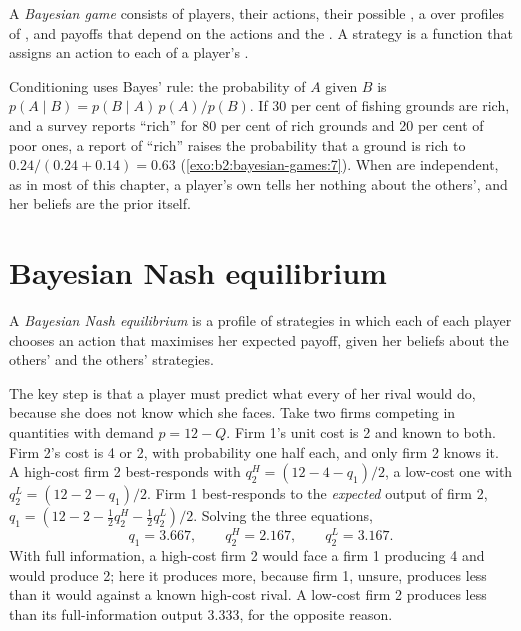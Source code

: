 \begin{definition}\label{def:b2:bayesian-games:bayesian-game}
A \emph{Bayesian game} consists of players, their actions, their possible , a  over profiles of , and payoffs that depend on the actions and the . A strategy is a function that
assigns an action to each of a player's .
\end{definition}

Conditioning uses Bayes' rule: the probability of $A$ given $B$ is $p(A \mid B) = p(B \mid A)\,p(A)/p(B)$. If 30 per cent of
fishing grounds are rich, and a survey reports ``rich'' for 80 per cent of rich grounds and 20 per cent of poor ones,
a report of ``rich'' raises the probability that a ground is rich to $0.24/(0.24 + 0.14) = 0.63$
(\cref{exo:b2:bayesian-games:7}). When  are independent, as in most of this chapter, a player's own  tells
her nothing about the others', and her beliefs are the prior itself.

\section{Bayesian Nash equilibrium}\label{sec:b2:bayesian-games:bne}

\begin{definition}\label{def:b2:bayesian-games:bne}
A \emph{Bayesian Nash equilibrium} is a profile of strategies in which each
 of each player chooses an action that maximises her expected payoff, given her beliefs about the others'
 and the others' strategies.
\end{definition}

The key step is that a player must predict what every  of her rival would do, because she does not know which
 she faces. Take two firms competing in quantities with demand $p = 12 - Q$. Firm 1's unit cost is 2 and
known to both. Firm 2's cost is 4 or 2, with probability one half each, and only firm 2 knows it. A high-cost
firm 2 best-responds with $q_2^H = (12 - 4 - q_1)/2$, a low-cost one with $q_2^L = (12 - 2 - q_1)/2$. Firm 1 best-responds to the
\emph{expected} output of firm 2, $q_1 = (12 - 2 - \tfrac12 q_2^H - \tfrac12 q_2^L)/2$. Solving the three equations,
\[
q_1 = 3.667, \qquad q_2^H = 2.167, \qquad q_2^L = 3.167.
\]
With full information, a high-cost firm 2 would face a firm 1 producing 4 and would produce 2; here it produces more,
because firm 1, unsure, produces less than it would against a known high-cost rival. A low-cost firm 2 produces less
than its full-information output 3.333, for the opposite reason.

